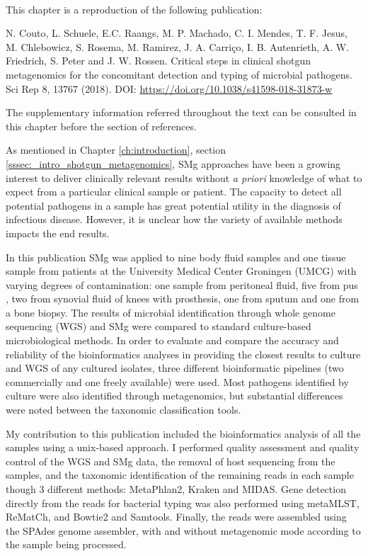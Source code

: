 \mbox{}\\
\vspace{8cm}

This chapter is a reproduction of the following publication:

N. Couto, L. Schuele, E.C. Raangs, M. P. Machado, C. I. Mendes, T. F. Jesus, M. Chlebowicz,  S. Rosema, M. Ramirez, J. A. Carriço, I. B. Autenrieth, A. W. Friedrich, S. Peter and J. W. Rossen. Critical steps in clinical shotgun metagenomics for the concomitant detection and typing of microbial pathogens. Sci Rep 8, 13767 (2018). DOI: \url{https://doi.org/10.1038/s41598-018-31873-w}

The supplementary information referred throughout the text can be consulted in this chapter before the section of references. 

As mentioned in Chapter \ref{ch:introduction}, section \ref{sssec:_intro_shotgun_metagenomics}, \ac{SMg} approaches have been a growing interest to deliver clinically relevant results without \textit{a priori} knowledge of what to expect from a particular clinical sample or patient. 
The capacity to detect all potential pathogens in a sample has great potential utility in the diagnosis of infectious disease. 
However, it is unclear how the variety of available methods impacts the end results.

In this publication \ac{SMg} was applied to nine body fluid samples and one tissue sample from patients at the University Medical Center Groningen (UMCG) with varying degrees of contamination: one sample from peritoneal fluid, five from pus , two from synovial fluid of knees with prosthesis, one from sputum and one from a bone biopsy. The results of microbial identification through whole genome sequencing (\ac{WGS}) and \ac{SMg} were compared to standard culture-based microbiological methods. 
In order to evaluate and compare the accuracy and reliability of the bioinformatics analyses in providing the closest results to culture and \ac{WGS} of any cultured isolates, three different bioinformatic pipelines (two commercially and one freely available) were used. Most pathogens identified by culture were also identified through metagenomics, but substantial differences were noted between the taxonomic classification tools. 

My contribution to this publication included the bioinformatics analysis of all the samples using a unix-based approach. I performed quality assessment and quality control of the \ac{WGS} and \ac{SMg} data, the removal of host sequencing from the samples, and the taxonomic identification of the remaining reads in each sample though 3 different methods: MetaPhlan2, Kraken and MIDAS. Gene detection directly from the reads for bacterial typing was also performed using metaMLST, ReMatCh, and Bowtie2 and Samtools. Finally, the reads were assembled using the SPAdes genome assembler, with and without metagenomic mode according to the sample being processed. 

